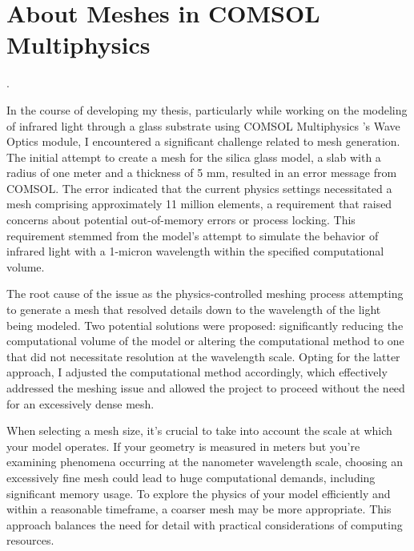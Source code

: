 \section{About Meshes in COMSOL Multiphysics}.

In the course of developing my thesis, particularly while working on the modeling of infrared light through a glass substrate using COMSOL Multiphysics \texttrademark's Wave Optics module, I encountered a significant challenge related to mesh generation. The initial attempt to create a mesh for the silica glass model, a slab with a radius of one meter and a thickness of 5 mm, resulted in an error message from COMSOL. The error indicated that the current physics settings necessitated a mesh comprising approximately 11 million elements, a requirement that raised concerns about potential out-of-memory errors or process locking. This requirement stemmed from the model's attempt to simulate the behavior of infrared light with a 1-micron wavelength within the specified computational volume.

The root cause of the issue as the physics-controlled meshing process attempting to generate a mesh that resolved details down to the wavelength of the light being modeled. Two potential solutions were proposed: significantly reducing the computational volume of the model or altering the computational method to one that did not necessitate resolution at the wavelength scale. Opting for the latter approach, I adjusted the computational method accordingly, which effectively addressed the meshing issue and allowed the project to proceed without the need for an excessively dense mesh.

When selecting a mesh size, it's crucial to take into account the scale at which your model operates. If your geometry is measured in meters but you're examining phenomena occurring at the nanometer wavelength scale, choosing an excessively fine mesh could lead to huge computational demands, including significant memory usage. To explore the physics of your model efficiently and within a reasonable timeframe, a coarser mesh may be more appropriate. This approach balances the need for detail with practical considerations of computing resources.